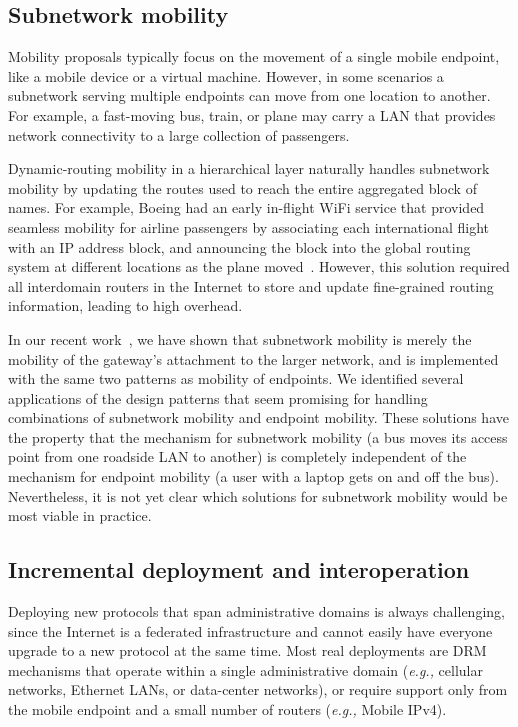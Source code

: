 \subsection{Subnetwork mobility}

Mobility proposals typically focus on the
movement of a single mobile endpoint, like a mobile device or a virtual
machine.  However, in some scenarios a subnetwork serving
multiple endpoints can move from one location to another.  
For example, a
fast-moving bus, train, or plane may carry a LAN
that provides network
connectivity to a large collection of passengers.  

Dynamic-routing
mobility in a hierarchical layer
naturally handles subnetwork mobility by updating the routes used
to reach the entire aggregated block of names.
For example, Boeing had an early in-flight WiFi service
that provided seamless mobility for airline passengers by associating
each international flight with an IP address block, and announcing the
block into the global routing system at different locations as the
plane moved~\cite{connexion}.  However, this solution required all
interdomain routers in the Internet to store and update fine-grained
routing information, leading to high overhead.  

In our recent work~\cite{cnm}, we have shown that subnetwork
mobility is merely the mobility of the gateway's attachment to the
larger network, and is implemented with the same two patterns as
mobility of endpoints.
We identified several applications of the design
patterns that seem promising
for handling combinations of subnetwork mobility and endpoint
mobility. 
These solutions have the property that the mechanism for subnetwork
mobility (a bus moves its access point from one roadside LAN to another)
is completely independent of the mechanism for endpoint mobility
(a user with a laptop gets on and off the bus).
Nevertheless, it is not yet clear which solutions for
subnetwork mobility would be most viable in practice.

\subsection{Incremental deployment and interoperation}

Deploying new protocols that span
administrative domains is always challenging, since the Internet
is a federated
infrastructure and cannot easily have everyone upgrade to a new
protocol at the same time.
Most real deployments are DRM mechanisms that
operate within a single administrative domain ({\it e.g.,}
cellular networks, Ethernet LANs, or data-center networks),
or require support only from the mobile endpoint and a small number of
routers ({\it e.g.,} Mobile IPv4).  

